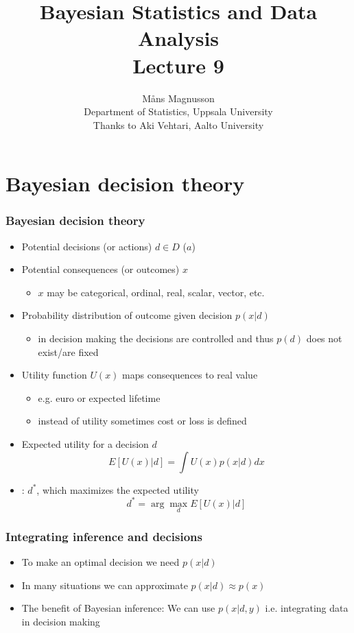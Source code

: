 \documentclass[10pt,handout]{beamer}
\title[]{{\color{black}Bayesian Statistics and Data Analysis \\ Lecture 9}}
\author[]{M{\aa}ns Magnusson \\ Department of Statistics, Uppsala University \\ Thanks to Aki Vehtari, Aalto University}
\date{}
\begin{document}
\frame{\titlepage
}



\section{Bayesian decision theory}
\frame{\sectionpage}


\begin{frame}

\frametitle{Bayesian decision theory}

  \begin{itemize}
  \item<+-> Potential decisions (or actions) $d \in D$ ($a$)
  \pause
  \item<+-> Potential consequences (or outcomes) $x$
    \begin{itemize}
      \item $x$ may be categorical, ordinal, real, scalar, vector, etc.
    \end{itemize}
    \pause
  \item<+-> Probability distribution of outcome given decision $p(x|d)$
    \begin{itemize}
    \item in decision making the decisions are controlled and thus $p(d)$ does not exist/are fixed
    \end{itemize}
    \pause
  \item<+->  Utility function $U(x)$ maps consequences to real value
    \begin{itemize}
      \item e.g. euro or expected lifetime
      \item instead of utility sometimes cost or loss is defined
    \end{itemize}
  \pause
  \item<+-> Expected utility for a decision $d$
  \[
  E[U(x)|d]=\int U(x) p(x|d) dx
  \]
  \pause
  \item<+-> : $d^*$, which maximizes the expected utility
    \begin{equation*}
      d^*=\arg\max_d E[U(x)|d]
    \end{equation*}
  \end{itemize}

\end{frame}

\begin{frame}

\frametitle{Integrating inference and decisions}

  \begin{itemize}
    \item<+-> To make an optimal decision we need $p(x|d)$
    \pause
    \item<+-> In many situations we can approximate $p(x|d) \approx p(x)$
    \pause
    \item<+-> The benefit of Bayesian inference: We can use $p(x|d, y)$ i.e. integrating data in decision making
  \end{itemize}

\end{frame}
\end{document}
